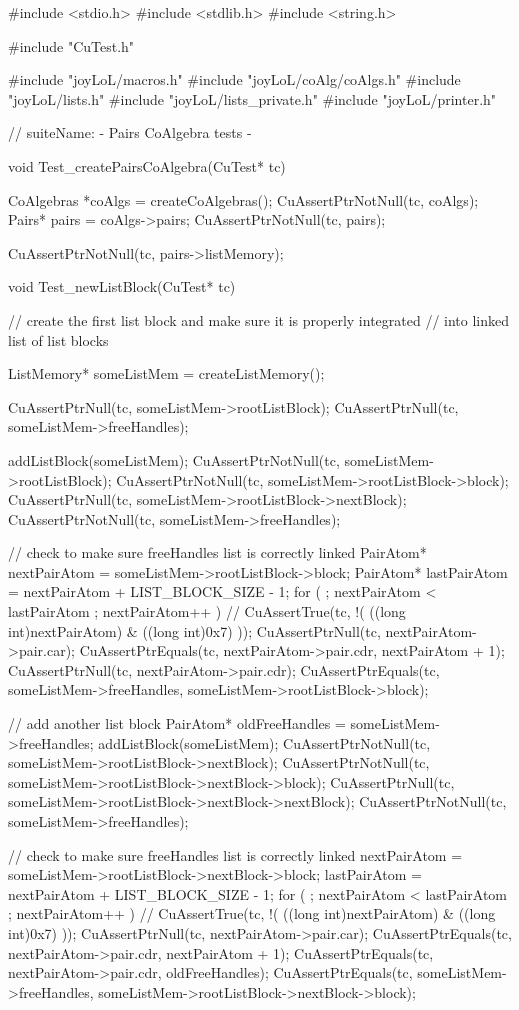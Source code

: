 \starttyping
#include <stdio.h>
#include <stdlib.h>
#include <string.h>

#include "CuTest.h"

#include "joyLoL/macros.h"
#include "joyLoL/coAlg/coAlgs.h"
#include "joyLoL/lists.h"
#include "joyLoL/lists_private.h"
#include "joyLoL/printer.h"

// suiteName: - Pairs CoAlgebra tests -

void Test_createPairsCoAlgebra(CuTest* tc) {
  CoAlgebras *coAlgs = createCoAlgebras();
  CuAssertPtrNotNull(tc, coAlgs);
  Pairs* pairs = coAlgs->pairs;
  CuAssertPtrNotNull(tc, pairs);

  CuAssertPtrNotNull(tc, pairs->listMemory);
}

void Test_newListBlock(CuTest* tc) {
  // create the first list block and make sure it is properly integrated
  // into linked list of list blocks

  ListMemory* someListMem = createListMemory();

  CuAssertPtrNull(tc, someListMem->rootListBlock);
  CuAssertPtrNull(tc, someListMem->freeHandles);

  addListBlock(someListMem);
  CuAssertPtrNotNull(tc, someListMem->rootListBlock);
  CuAssertPtrNotNull(tc, someListMem->rootListBlock->block);
  CuAssertPtrNull(tc, someListMem->rootListBlock->nextBlock);
  CuAssertPtrNotNull(tc, someListMem->freeHandles);

  // check to make sure freeHandles list is correctly linked
  PairAtom* nextPairAtom = someListMem->rootListBlock->block;
  PairAtom* lastPairAtom = nextPairAtom + LIST_BLOCK_SIZE - 1;
  for ( ; nextPairAtom < lastPairAtom ; nextPairAtom++ ) {
//    CuAssertTrue(tc, !( ((long int)nextPairAtom) & ((long int)0x7) ));
    CuAssertPtrNull(tc, nextPairAtom->pair.car);
    CuAssertPtrEquals(tc, nextPairAtom->pair.cdr, nextPairAtom + 1);
  }
  CuAssertPtrNull(tc, nextPairAtom->pair.cdr);
  CuAssertPtrEquals(tc, someListMem->freeHandles, someListMem->rootListBlock->block);

  // add another list block
  PairAtom* oldFreeHandles = someListMem->freeHandles;
  addListBlock(someListMem);
  CuAssertPtrNotNull(tc, someListMem->rootListBlock->nextBlock);
  CuAssertPtrNotNull(tc, someListMem->rootListBlock->nextBlock->block);
  CuAssertPtrNull(tc, someListMem->rootListBlock->nextBlock->nextBlock);
  CuAssertPtrNotNull(tc, someListMem->freeHandles);

  // check to make sure freeHandles list is correctly linked
  nextPairAtom = someListMem->rootListBlock->nextBlock->block;
  lastPairAtom = nextPairAtom + LIST_BLOCK_SIZE - 1;
  for ( ; nextPairAtom < lastPairAtom ; nextPairAtom++ ) {
//    CuAssertTrue(tc, !( ((long int)nextPairAtom) & ((long int)0x7) ));
    CuAssertPtrNull(tc, nextPairAtom->pair.car);
    CuAssertPtrEquals(tc, nextPairAtom->pair.cdr, nextPairAtom + 1);
  }
  CuAssertPtrEquals(tc, nextPairAtom->pair.cdr, oldFreeHandles);
  CuAssertPtrEquals(tc, someListMem->freeHandles, someListMem->rootListBlock->nextBlock->block);
}

